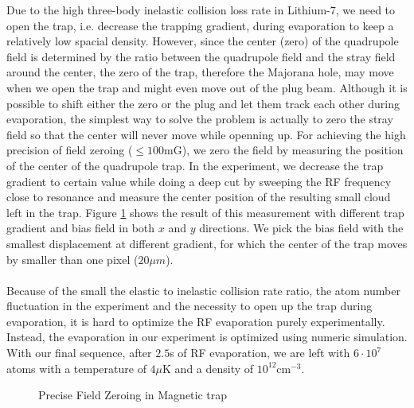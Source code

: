 Due to the high three-body inelastic collision loss rate in Lithium-$7$, we need to open the trap, i.e. decrease the trapping gradient, during evaporation to keep a relatively low spacial density. However, since the center (zero) of the quadrupole field is determined by the ratio between the quadrupole field and the stray field around the center, the zero of the trap, therefore the Majorana hole, may move when we open the trap and might even move out of the plug beam. Although it is possible to shift either the zero or the plug and let them track each other during evaporation, the simplest way to solve the problem is actually to zero the stray field so that the center will never move while openning up. For achieving the high precision of field zeroing ($\leqslant100\text{mG}$), we zero the field by measuring the position of the center of the quadrupole trap. In the experiment, we decrease the trap gradient to certain value while doing a deep cut by sweeping the RF frequency close to resonance and measure the center position of the resulting small cloud left in the trap. Figure \ref{exp:field-zeroing} shows the result of this measurement with different trap gradient and bias field in both $x$ and $y$ directions. We pick the bias field with the smallest displacement at different gradient, for which the center of the trap moves by smaller than one pixel ($20\mu m$).\\
\\
Because of the small the elastic to inelastic collision rate ratio, the atom number fluctuation in the experiment and the necessity to open up the trap during evaporation, it is hard to optimize the RF evaporation purely experimentally. Instead, the evaporation in our experiment is optimized using numeric simulation. With our final sequence, after $2.5$s of RF evaporation, we are left with $6\cdot10^7$ atoms with a temperature of $4\mu$K and a density of $10^{12}\text{cm}^{-3}$.
\begin{figure}
  \begin{center}
  \end{center}
  \caption{Precise Field Zeroing in Magnetic trap}
  \label{exp:field-zeroing}
\end{figure}

